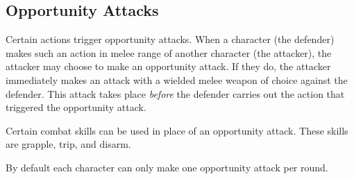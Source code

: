 \begin{multicols*}{2}
    \section{Opportunity Attacks}
    Certain actions trigger opportunity attacks. When a character (the
    defender) makes such an action in melee range of another character (the
    attacker), the attacker may choose to make an opportunity attack. If they
    do, the attacker immediately makes an attack with a wielded melee weapon
    of choice against the defender. This attack takes place \textit{before}
    the defender carries out the action that triggered the opportunity attack.

    Certain combat skills can be used in place of an opportunity attack. These
    skills are grapple, trip, and disarm.

    By default each character can only make one opportunity attack per round.
\end{multicols*}
